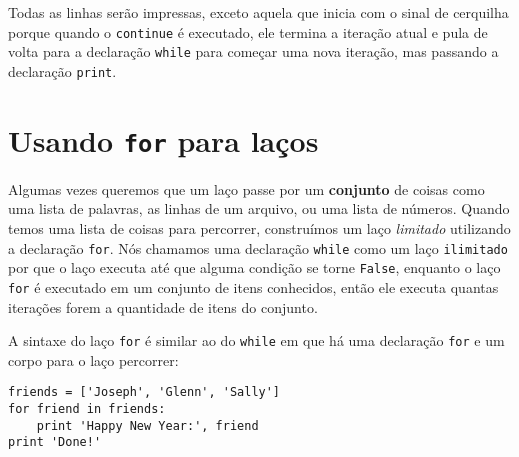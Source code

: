 %
Todas as linhas serão impressas, exceto aquela que inicia com o sinal de
cerquilha porque quando o {\tt continue} é executado, ele termina a iteração
atual e pula de volta para a declaração {\tt while} para começar uma nova
iteração, mas passando a declaração {\tt print}.

\section{Usando {\tt for} para laços}


Algumas vezes queremos que um laço passe por um {\bf conjunto} de coisas
como uma lista de palavras, as linhas de um arquivo, ou uma lista de números.
Quando temos uma lista de coisas para percorrer, construímos um laço
\emph{limitado} utilizando a declaração {\tt for}. Nós chamamos uma declaração
{\tt while} como um laço {\tt ilimitado} por que o laço executa até que alguma
condição se torne {\tt False}, enquanto o laço {\tt for} é executado em um
conjunto de itens conhecidos, então ele executa quantas iterações forem a
quantidade de itens do conjunto.


A sintaxe do laço {\tt for} é similar ao do {\tt while} em que há uma
declaração {\tt for} e um corpo para o laço percorrer:

\beforeverb
\begin{verbatim}
friends = ['Joseph', 'Glenn', 'Sally']
for friend in friends:
    print 'Happy New Year:', friend
print 'Done!'
\end{verbatim}
\afterverb
%


